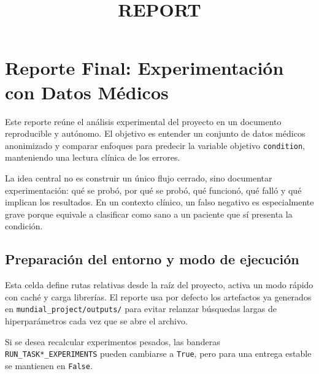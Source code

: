 \documentclass[11pt]{article}
\title{REPORT}
\begin{document}
    
    \maketitle
    
    

    
    \section{Reporte Final: Experimentación con Datos
Médicos}\label{reporte-final-experimentaciuxf3n-con-datos-muxe9dicos}

Este reporte reúne el análisis experimental del proyecto en un documento
reproducible y autónomo. El objetivo es entender un conjunto de datos
médicos anonimizado y comparar enfoques para predecir la variable
objetivo \texttt{condition}, manteniendo una lectura clínica de los
errores.

La idea central no es construir un único flujo cerrado, sino documentar
experimentación: qué se probó, por qué se probó, qué funcionó, qué falló
y qué implican los resultados. En un contexto clínico, un falso negativo
es especialmente grave porque equivale a clasificar como sano a un
paciente que sí presenta la condición.

    \subsection{Preparación del entorno y modo de
ejecución}\label{preparaciuxf3n-del-entorno-y-modo-de-ejecuciuxf3n}

Esta celda define rutas relativas desde la raíz del proyecto, activa un
modo rápido con caché y carga librerías. El reporte usa por defecto los
artefactos ya generados en \texttt{mundial\_project/outputs/} para
evitar relanzar búsquedas largas de hiperparámetros cada vez que se abre
el archivo.

Si se desea recalcular experimentos pesados, las banderas
\texttt{RUN\_TASK*\_EXPERIMENTS} pueden cambiarse a \texttt{True}, pero
para una entrega estable se mantienen en \texttt{False}.
\end{document}

